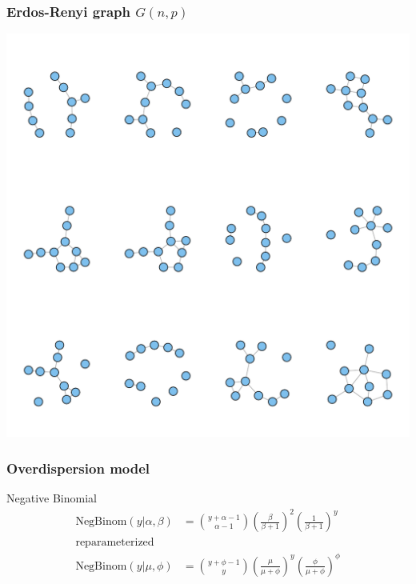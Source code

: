 \documentclass{beamer}
\begin{document}
\begin{frame}
  \frametitle{Erdos-Renyi graph \(G(n, p)\)}
  \begin{center}
    \includegraphics[height = 0.8\textheight, width = \textwidth,  keepaspectratio = true]{figure/rng_graphs}
  \end{center}
\end{frame}

\begin{frame}
  \frametitle{Overdispersion model}

  \begin{block}{Negative Binomial}
    \begin{align*}
      \mathrm{NegBinom}(y | \alpha, \beta) &= {y + \alpha -1 \choose \alpha - 1} \left(\frac{\beta}{\beta + 1}\right)^{2} \left(\frac{1}{\beta + 1}\right)^{y} \\
      \mathrm{reparameterized} \\
      \mathrm{NegBinom}(y | \mu, \phi) &= {y + \phi -1 \choose y} \left(\frac{\mu}{\mu + \phi}\right)^{y} \left(\frac{\phi}{\mu + \phi}\right)^{\phi}
    \end{align*}
  \end{block}
\end{frame}
\end{document}
